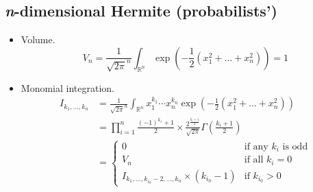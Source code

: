 \documentclass[draft]{scrartcl}
\begin{document}
\subsection*{\textit{n}-dimensional Hermite (probabilists')}
\begin{itemize}
  \item Volume.
    \begin{equation}
      V_n = \frac{1}{\sqrt{2\pi}^n} \int_{\mathbb{R}^n}
      \exp\left(-\frac{1}{2}(x_1^2+\dots+x_n^2)\right) = 1
    \end{equation}


  \item Monomial integration.
  \begin{align}\nonumber
    I_{k_1,\dots,k_n}
      &= \frac{1}{\sqrt{2\pi}^n} \int_{\mathbb{R}^n} x_1^{k_1}\cdots x_n^{k_n}
      \exp\left(-\frac{1}{2}(x_1^2+\dots+x_n^2)\right)\\
    &= \prod_{i=1}^n \frac{(-1)^{k_i} + 1}{2} \times
      \frac{2^{\frac{k_i+1}{2}}}{\sqrt{2\pi}} \Gamma\left(\frac{k_i+1}{2}\right)\\
    &=\begin{cases}
      0&\text{if any $k_i$ is odd}\\
      V_n&\text{if all $k_i=0$}\\
      I_{k_1,\dots,k_{i_0}-2,\dots,k_n} \times (k_{i_0} - 1)&\text{if $k_{i_0} > 0$}
    \end{cases}
  \end{align}
\end{itemize}
\end{document}
